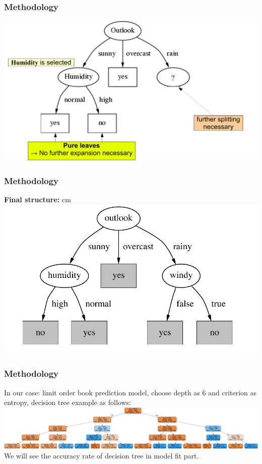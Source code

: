 \documentclass[xcolor={x11names,svgnames,dvipsnames}]{beamer}
\begin{document}
\begin{frame}
\frametitle{Methodology}


      \includegraphics[width=1\textwidth, height=0.7\textheight]{decision_tree7.png}
\end{frame}

\begin{frame}
\frametitle{Methodology}
\textbf{Final structure:}
 cm
      \includegraphics[width=1\textwidth, height=0.7\textheight]{decision_tree8.png}
\end{frame}

\begin{frame}
\frametitle{Methodology}
In our case: limit order book prediction model, choose depth as 6 and criterion as entropy, decision tree example as follows:\\
\vskip 0.3cm
 \includegraphics[width=1\textwidth, height=0.5\textheight]{decision_tree.png}\\
\vskip 0.3cm
We will see the accuracy rate of decision tree in model fit part.
\end{frame}
\end{document}
